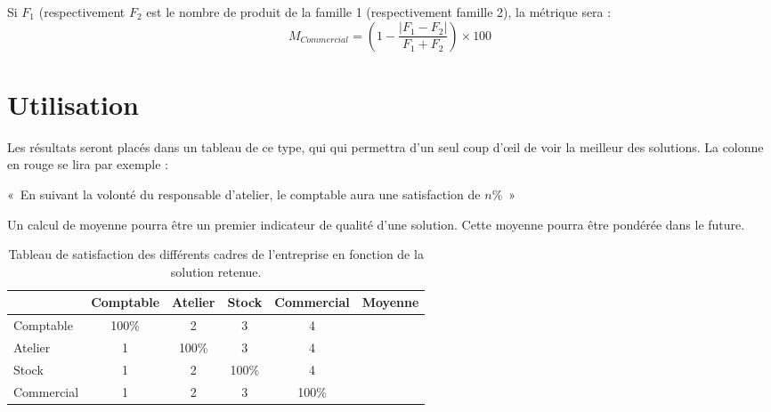 Si $F_1$ (respectivement $F_2$ est le nombre de produit de la famille 1
(respectivement famille 2), la métrique sera :
$$
M_{Commercial} = \left( 1 - \frac{|F_1 - F_2|}{F_1 + F_2} \right) \times 100
$$

\section{Utilisation}
Les résultats seront placés dans un tableau de ce type, qui qui permettra d'un
seul coup d'œil de voir la meilleur des solutions.
La colonne en rouge se lira par exemple : 
\begin{center}
«~En suivant la volonté du responsable d'atelier, le comptable aura une
satisfaction de $n\%$~»
\end{center}

Un calcul de moyenne pourra être un premier indicateur de qualité d'une
solution. Cette moyenne pourra être pondérée dans le future.

\begin{table}[h!]
    \begin{center}
    \begin{tabular}{|l|c|c|c|c|c|}
	\hline
	\cellcolor[gray]{0.9} & Comptable& Atelier & Stock & Commercial &
	Moyenne\\
	\hline
	Comptable & \cellcolor[gray]{0.9} 100\% & 2 & 3 & 4 & \\
	\hline
	Atelier & \cellcolor{red}1 & \cellcolor[gray]{0.9} 100\%  & 3 & 4 & \\
	\hline
	Stock & 1 & 2 & \cellcolor[gray]{0.9} 100\%  & 4 & \\
	\hline 
	Commercial & 1 & 2 & 3 & \cellcolor[gray]{0.9} 100\% & \\
	\hline
    \end{tabular}
    \end{center}
    \caption{Tableau de satisfaction des différents cadres de l'entreprise en
	fonction de la solution retenue.}
\end{table}



\begin{comment}
\begin{tabular}{|l||c|c|c|c||c|c|c|c||c|c|c|c||c|c|c|c|}
\hline
~ & \multicolumn{4}{|c||}{Comptable}
  & \multicolumn{4}{|c||}{Atelier}
  & \multicolumn{4}{|c||}{Stock}
  & \multicolumn{4}{|c|}{Commercial} \\
  \hline
Comptable & 1 & 2 & 3 & 4
	  & 1 & 2 & 3 & 4 
	  & 1 & 2 & 3 & 4
	  & 1 & 2 & 3 & 4 \\
\hline
Atelier & 1 & 2 & 3 & 4
	  & 1 & 2 & 3 & 4 
	  & 1 & 2 & 3 & 4
	  & 1 & 2 & 3 & 4 \\
\hline
Stock & 1 & 2 & 3 & 4
      & 1 & 2 & 3 & 4 
      & 1 & 2 & 3 & 4
      & 1 & 2 & 3 & 4 \\
\hline 
Commercial & 1 & 2 & 3 & 4
	   & 1 & 2 & 3 & 4 
	   & 1 & 2 & 3 & 4
	   & 1 & 2 & 3 & 4 \\
\hline


\end{tabular}

\end{comment}
